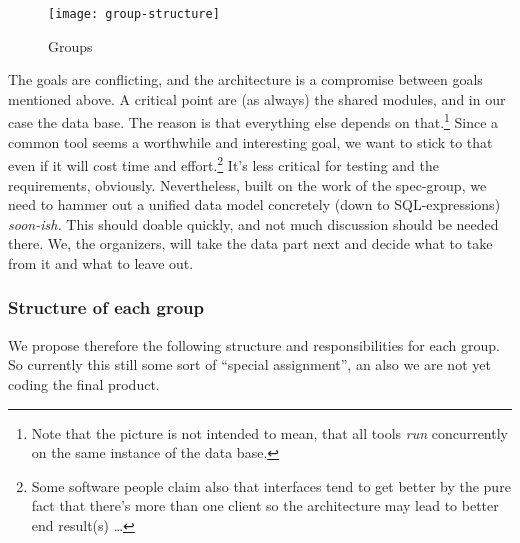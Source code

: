\documentclass[11pt,handout]{handout}
\begin{document}
{

\begin{figure}[htbp]
  \centering
  \texttt{[image: group-structure]}  
  \caption{Groups}
  \label{fig:groups}
\end{figure}


The goals are conflicting, and the architecture is a compromise between
goals mentioned above. A critical point are (as always) the shared modules,
and in our case the data base. The reason is that everything else depends
on that.\footnote{Note that the picture is not intended to mean, that all
  tools \emph{run} concurrently on the same instance of the data base.}
Since a common tool seems a worthwhile and interesting goal, we want to
stick to that even if it will cost time and effort.\footnote{Some software
  people claim also that interfaces tend to get better by the pure fact
  that there's more than one client so the architecture may lead to better
  end result(s) \ldots} It's less critical for testing and the
requirements, obviously.  Nevertheless, built on the work of the
spec-group, we need to hammer out a unified data model concretely (down to
SQL-expressions) \emph{soon-ish.}  This should doable quickly, and not much
discussion should be needed there. We, the organizers, will take the data
part next and decide what to take from it and what to leave out. 



\subsubsection*{Structure of each group}

We propose therefore the following structure and responsibilities for each
group. So currently this still some sort of ``special assignment'', an also
we are not yet coding the final product.



}
\end{document}
